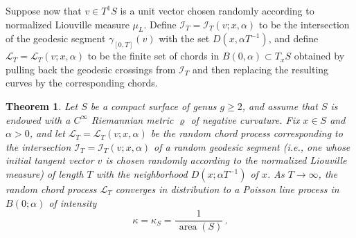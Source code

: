 \documentclass[10pt]{amsart}
\newtheorem{theo}{Theorem}[section]
\theoremstyle{definition}\newtheorem{defi}[theo]{Definition}\newtheorem{rema}[theo]{Remark}\newtheorem{exam}[theo]{Example}\newtheorem{exem}[theo]{Example}\newtheorem{nota}[theo]{Notation}
\DeclareMathOperator{\area}{area}
\begin{document}
Suppose now that $v\in T^{1}S$ is a unit vector chosen randomly according to normalized Liouville measure $\mu_{L}$. Define $\mathcal{I}_{T}=\mathcal{I}_{T}(v; x, \alpha)$ to be the intersection of the geodesic segment $\gamma_{[0,T]}(v)$ with the set $D(x,\alpha T^{-1})$, and define $\mathcal{L}_{T}= \mathcal{L}_{T}(v; x, \alpha)$ to be the finite set of chords in $B(0,\alpha)\subset T_{x}S$ obtained by pulling back the geodesic crossings from $\mathcal{I}_{T}$ and then replacing the resulting curves by the corresponding chords.



\begin{theo}\label{theorem:random-local}
Let $S$ be a compact surface of genus $g \geq 2$, and assume that $S$ is endowed with a $C^{\infty}$ Riemannian metric $\varrho$ of negative curvature. Fix $x\in S$ and $\alpha >0$, and let $\mathcal{L}_{T}= \mathcal{L}_{T}(v; x,\alpha)$ be the random chord process corresponding to the intersection $\mathcal{I}_{T}=\mathcal{I}_{T}(v; x, \alpha)$ of a random geodesic segment (i.e., one whose initial tangent vector $v$ is chosen randomly according to the normalized Liouville measure) of length $T$ with the neighborhood $D(x;\alpha T^{-1})$ of $x$. As $T \rightarrow \infty$, the random chord process $\mathcal{L}_{T}$ converges in distribution to a Poisson line process in $B (0;\alpha)$ of intensity
\begin{equation}\label{eq:kappa-S}
\kappa=\kappa_{S}=\frac{1}{\,\area (S)}\,.
\end{equation}
\end{theo}
\end{document}
